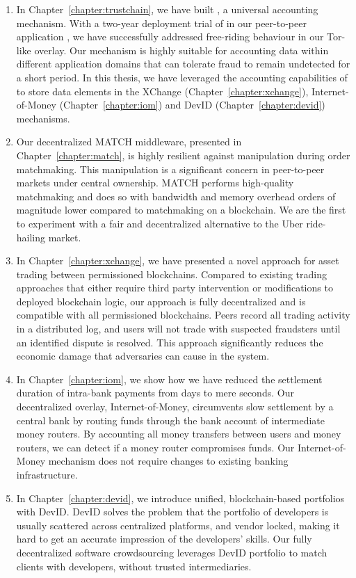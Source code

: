 \begin{enumerate}
	\item In Chapter~\ref{chapter:trustchain}, we have built \TrustChain{}, a universal accounting mechanism.
	With a two-year deployment trial of \TrustChain{} in our peer-to-peer application \Tribler{}, we have successfully addressed free-riding behaviour in our Tor-like overlay.
	Our \TrustChain{} mechanism is highly suitable for accounting data within different application domains that can tolerate fraud to remain undetected for a short period.
	In this thesis, we have leveraged the accounting capabilities of \TrustChain{} to store data elements in the XChange (Chapter~\ref{chapter:xchange}), Internet-of-Money (Chapter~\ref{chapter:iom}) and DevID (Chapter~\ref{chapter:devid}) mechanisms.
	
	\item Our decentralized MATCH middleware, presented in Chapter~\ref{chapter:match}, is highly resilient against manipulation during order matchmaking.
	This manipulation is a significant concern in peer-to-peer markets under central ownership.
	MATCH performs high-quality matchmaking and does so with bandwidth and memory overhead orders of magnitude lower compared to matchmaking on a blockchain.
	We are the first to experiment with a fair and decentralized alternative to the Uber ride-hailing market.
	
	\item In Chapter~\ref{chapter:xchange}, we have presented a novel approach for asset trading between permissioned blockchains.
	Compared to existing trading approaches that either require third party intervention or modifications to deployed blockchain logic, our approach is fully decentralized and is compatible with all permissioned blockchains.
	Peers record all trading activity in a distributed log, and users will not trade with suspected fraudsters until an identified dispute is resolved.
	This approach significantly reduces the economic damage that adversaries can cause in the system.
	
	\item In Chapter~\ref{chapter:iom}, we show how we have reduced the settlement duration of intra-bank payments from days to mere seconds.
	Our decentralized overlay, Internet-of-Money, circumvents slow settlement by a central bank by routing funds through the bank account of intermediate money routers.
	By accounting all money transfers between users and money routers, we can detect if a money router compromises funds.
	Our Internet-of-Money mechanism does not require changes to existing banking infrastructure.
	
	\item In Chapter~\ref{chapter:devid}, we introduce unified, blockchain-based portfolios with DevID.
	DevID solves the problem that the portfolio of developers is usually scattered across centralized platforms, and vendor locked, making it hard to get an accurate impression of the developers' skills.
	Our fully decentralized software crowdsourcing leverages DevID portfolio to match clients with developers, without trusted intermediaries.
\end{enumerate}


